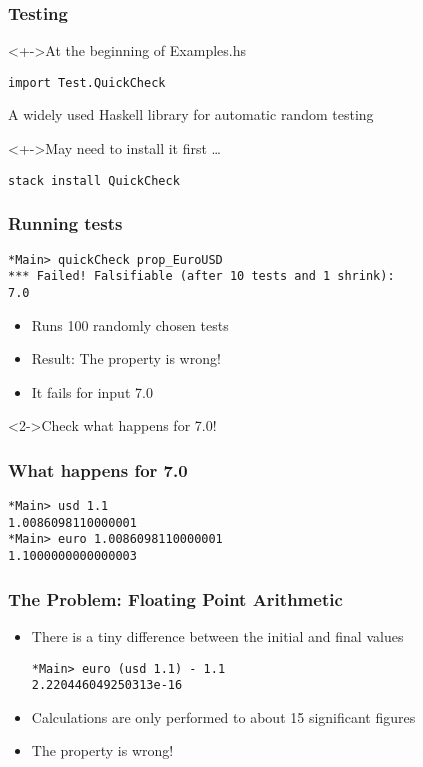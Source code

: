 \documentclass{beamer}
\begin{document}
\begin{frame}[fragile]
  \frametitle{Testing}
  \begin{block}<+->{At the beginning of Examples.hs}
\begin{verbatim}
import Test.QuickCheck
\end{verbatim}
    A widely used Haskell library for automatic random testing
  \end{block}
  \begin{block}<+->{May need to install it first \dots}
\begin{verbatim}
stack install QuickCheck
\end{verbatim}
  \end{block}
\end{frame}
\begin{frame}[fragile]
  \frametitle{Running tests}
\begin{verbatim}
*Main> quickCheck prop_EuroUSD
*** Failed! Falsifiable (after 10 tests and 1 shrink): 
7.0
\end{verbatim}
  \begin{itemize}
  \item Runs 100 randomly chosen tests
  \item Result: The property is wrong!
  \item It fails for input 7.0
  \end{itemize}
  \begin{alertblock}<2->{Check what happens for 7.0!}
    
  \end{alertblock}
\end{frame}
\begin{frame}[fragile]
  \frametitle{What happens for 7.0}
\begin{verbatim}
*Main> usd 1.1
1.0086098110000001
*Main> euro 1.0086098110000001
1.1000000000000003
\end{verbatim}
\end{frame}
\begin{frame}[fragile]
  \frametitle{The Problem: Floating Point Arithmetic}
  \begin{itemize}
  \item  There is a tiny difference between the initial and final values 
\begin{verbatim}
*Main> euro (usd 1.1) - 1.1
2.220446049250313e-16
\end{verbatim}
  \item Calculations are only performed to about 15 significant
    figures 
  \item  The property is wrong! 
  \end{itemize}
\end{frame}
\end{document}
